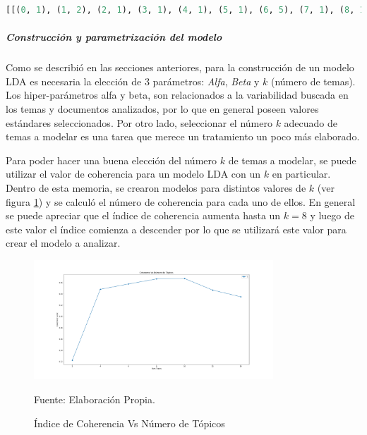     \begin{lstlisting}[language=Python]
    [[(0, 1), (1, 2), (2, 1), (3, 1), (4, 1), (5, 1), (6, 5), (7, 1), (8, 1), (9, 2), (10, 1), (11, 1), (12, 1), (13, 1), (14, 1), (15, 1), (16, 1), (17, 1), (18, 1), (19, 1), (20, 1), (21, 1), (22, 2), (23, 1), (24, 1), (25, 1), (26, 1), (27, 1), (28, 1), (29, 1), (30, 1), (31, 1), (32, 1), (33, 1), (34, 1), (35, 1), (36, 1), (37, 1), (38, 1), (39, 1), (40, 1), (41, 1), (42, 1), (43, 1), (44, 1), (45, 1), (46, 1), (47, 1), (48, 1), (49, 1), (50, 1)]]
    \end{lstlisting}
    
    \subparagraph{Construcción y parametrización del  modelo}
    \subparagraph*{}
    
    Como se describió en las secciones anteriores, para la construcción de un modelo LDA es necesaria la elección de 3 parámetros: \textit{Alfa}, \textit{Beta} y $k$ (número de temas). Los hiper-parámetros alfa y beta, son relacionados a la variabilidad buscada en los temas y documentos analizados, por lo que en general poseen valores estándares seleccionados. Por otro lado, seleccionar el número $k$ adecuado de temas a modelar es una tarea que merece un tratamiento un poco más elaborado. 
    
    Para poder hacer una buena elección del número $k$ de temas a modelar, se puede utilizar el valor de coherencia para un modelo LDA con un $k$ en particular. Dentro de esta memoria, se crearon modelos para distintos valores de $k$ (ver figura \ref{fig:Coherence}) y se calculó el número de coherencia para cada uno de ellos. En general se puede apreciar que el índice de coherencia aumenta hasta un $k=8$ y luego de este valor el índice comienza a descender por lo que se utilizará este valor para crear el modelo a analizar.
    
    \begin{figure}[h!]
        \centering
        \includegraphics[width=0.8\textwidth]{figures/LDA/Coherence.png}
        \caption{\label{fig:Coherence} Índice de Coherencia Vs Número de Tópicos} Fuente: Elaboración Propia.
    \end{figure}
    

